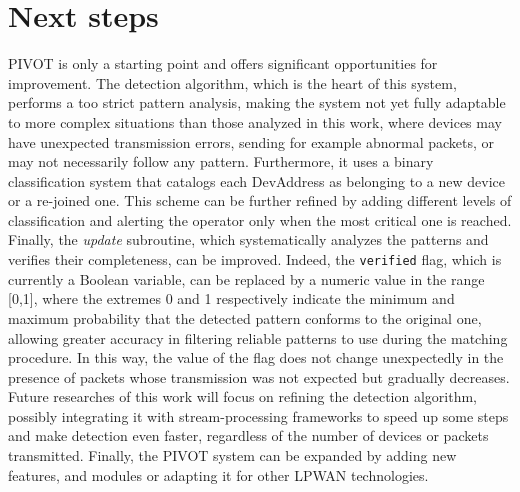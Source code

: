 \section{Next steps}
PIVOT is only a starting point and offers significant opportunities for improvement. The detection algorithm, which is the heart of this system, performs a too strict pattern analysis, making the system not yet fully adaptable to more complex situations than those analyzed in this work, where devices may have unexpected transmission errors, sending for example abnormal packets, or may not necessarily follow any pattern. Furthermore, it uses a binary classification system that catalogs each DevAddress as belonging to a new device or a re-joined one. This scheme can be further refined by adding different levels of classification and alerting the operator only when the most critical one is reached. Finally, the \textit{update} subroutine, which systematically analyzes the patterns and verifies their completeness, can be improved. Indeed, the \texttt{verified} flag, which is currently a Boolean variable, can be replaced by a numeric value in the range [0,1], where the extremes 0 and 1 respectively indicate the minimum and maximum probability that the detected pattern conforms to the original one, allowing greater accuracy in filtering reliable patterns to use during the matching procedure. In this way, the value of the flag does not change unexpectedly in the presence of packets whose transmission was not expected but gradually decreases. Future researches of this work will focus on refining the detection algorithm, possibly integrating it with stream-processing frameworks to speed up some steps and make detection even faster, regardless of the number of devices or packets transmitted. Finally, the PIVOT system can be expanded by adding new features, and modules or adapting it for other LPWAN technologies.